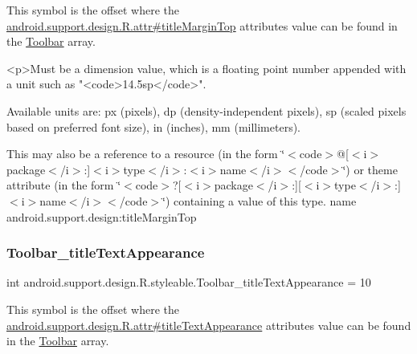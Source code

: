 This symbol is the offset where the \hyperlink{classandroid_1_1support_1_1design_1_1R_1_1attr_a3e498d603752368ce0e9f7455c87f6cb}{android.\+support.\+design.\+R.\+attr\#title\+Margin\+Top} attribute\textquotesingle{}s value can be found in the \hyperlink{classandroid_1_1support_1_1design_1_1R_1_1styleable_a7783ebe780dbe2a845802a40519a46e9}{Toolbar} array.

\begin{DoxyVerb}      <p>Must be a dimension value, which is a floating point number appended with a unit such as "<code>14.5sp</code>".
\end{DoxyVerb}
 Available units are\+: px (pixels), dp (density-\/independent pixels), sp (scaled pixels based on preferred font size), in (inches), mm (millimeters). 

This may also be a reference to a resource (in the form \char`\"{}$<$code$>$@\mbox{[}$<$i$>$package$<$/i$>$\+:\mbox{]}$<$i$>$type$<$/i$>$\+:$<$i$>$name$<$/i$>$$<$/code$>$\char`\"{}) or theme attribute (in the form \char`\"{}$<$code$>$?\mbox{[}$<$i$>$package$<$/i$>$\+:\mbox{]}\mbox{[}$<$i$>$type$<$/i$>$\+:\mbox{]}$<$i$>$name$<$/i$>$$<$/code$>$\char`\"{}) containing a value of this type.  name android.\+support.\+design\+:title\+Margin\+Top \mbox{\label{classandroid_1_1support_1_1design_1_1R_1_1styleable_aad88a5a97376d2cb38271639cec1ca2c}} 
\subsubsection{\texorpdfstring{Toolbar\+\_\+title\+Text\+Appearance}{Toolbar\_titleTextAppearance}}
{\footnotesize\ttfamily int android.\+support.\+design.\+R.\+styleable.\+Toolbar\+\_\+title\+Text\+Appearance = 10\hspace{0.3cm}{\ttfamily [static]}}

This symbol is the offset where the \hyperlink{classandroid_1_1support_1_1design_1_1R_1_1attr_ad430580335b0f55e7508d87c4a68b4d8}{android.\+support.\+design.\+R.\+attr\#title\+Text\+Appearance} attribute\textquotesingle{}s value can be found in the \hyperlink{classandroid_1_1support_1_1design_1_1R_1_1styleable_a7783ebe780dbe2a845802a40519a46e9}{Toolbar} array.


